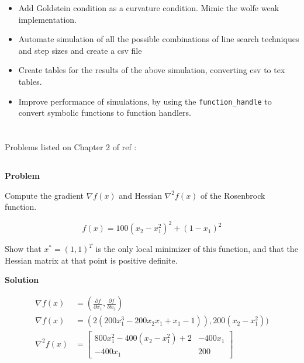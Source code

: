 \documentclass[a4paper,11pt]{article}
\numberwithin{equation}{section} %
\begin{document}
\begin{itemize}
\begin{itemize}
        \item Add Goldstein condition as a curvature condition. Mimic the wolfe weak implementation.
        \item Automate simulation of all the possible combinations of line search techniques and step sizes and create a csv file
        \item Create tables for the results of the above simulation, converting csv to tex tables.
        \item Improve performance of simulations, by using the \verb|function_handle| to convert symbolic functions to function handlers.
    \end{itemize}
\end{itemize}

\pagebreak

\section{}

Problems listed on Chapter 2 of ref \cite{nocedal1999numerical}:

\label{rosenbrock}
\subsection{}

\textbf{Problem}

Compute the gradient $\nabla f(x)$ and Hessian $\nabla^2 f(x)$ of the Rosenbrock function.

\begin{equation}
    f(x) = 100(x_2 -x_1^2)^2 + (1-x_1)^2
\end{equation}

Show that $x^{\ast} = (1, 1)^{T}$ is the only local minimizer of this function, and that the Hessian matrix at that point is positive definite.


\textbf{Solution}

\begin{align}
    \nabla f(x) &= (\frac{\partial f}{\partial x_1}, \frac{\partial f}{\partial x_2}) \\
    \nabla f(x) &= (2(200x_1^3 -200x_2x_1 + x_1- 1)), 200(x_2 - x_1^2)) \\
    \nabla^2 f(x) &=
    \begin{bmatrix}
    800x_1^2 - 400(x_2 - x_1^2) +2 & -400x_1 \\
    -400x_1 & 200
    \end{bmatrix}
\end{align}
\end{document}
